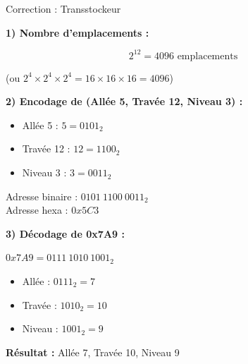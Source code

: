 \documentclass[aspectratio=1610]{beamer}
\begin{document}
\begin{frame}{Correction : Transstockeur}

  \textbf{1) Nombre d'emplacements :}

  \[
    2^{12} = 4096 \text{ emplacements}
  \]

  (ou $2^4 \times 2^4 \times 2^4 = 16 \times 16 \times 16 = 4096$)

  \vspace{0.3cm}

  \textbf{2) Encodage de (Allée 5, Travée 12, Niveau 3) :}

  \begin{itemize}
    \item Allée 5 : $5 = 0101_2$
    \item Travée 12 : $12 = 1100_2$
    \item Niveau 3 : $3 = 0011_2$
  \end{itemize}

  Adresse binaire : $0101\ 1100\ 0011_2$ \\
  Adresse hexa : $0x5C3$

  \vspace{0.3cm}

  \textbf{3) Décodage de 0x7A9 :}

  $0x7A9 = 0111\ 1010\ 1001_2$

  \begin{itemize}
    \item Allée : $0111_2 = 7$
    \item Travée : $1010_2 = 10$
    \item Niveau : $1001_2 = 9$
  \end{itemize}

  \textbf{Résultat :} Allée 7, Travée 10, Niveau 9

\end{frame}
\end{document}
